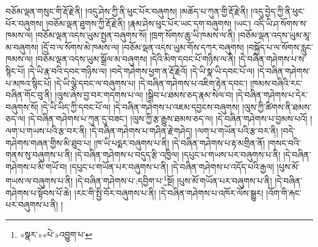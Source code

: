 བཅོམ་ལྡན་གསུང་གི་རྡོ་རྗེ་ནི། །འདུ་ཤེས་ཀྱི་ནི་ཕུང་པོར་བཞུགས། །མཆོད་པ་ཀུན་གྱི་རྡོ་རྗེ་ནི། །འདུ་བྱེད་ཀྱི་ནི་ཕུང་པོར་བཞུགས། །བཅོམ་ལྡན་ཐུགས་ཀྱི་རྡོ་རྗེ་ནི། །རྣམ་ཤེས་ཕུང་པོར་ཡང་དག་བཞུགས། །ཡང་། འདི་ཡི་ཤ་སོགས་ས་ཁམས་ལ། །བཅོམ་ལྡན་འདས་ཡུམ་སྤྱན་བཞུགས་སོ། །ཁྲག་སོགས་ཆུ་ཡི་ཁམས་ལ་ནི། །བཅོམ་ལྡན་འདས་ཡུམ་མཱ་མ་བཞུགས། །དྲོ་བ་ལ་སོགས་མེ་ཁམས་ལ། །བཅོམ་ལྡན་འདས་ཡུམ་གོས་དཀར་བཞུགས། །བསྐྱོད་པ་ལ་སོགས་རླུང་ཁམས་ལ། །བཅོམ་ལྡན་འདས་ཡུམ་སྒྲོལ་མ་བཞུགས། །དེའི་མིག་དབང་པོ་གཉིས་ལ་ནི། །དེ་བཞིན་གཤེགས་པ་ས་སྙིང་པོ། །དེ་ཡི་རྣ་བའི་དབང་གཉིས་ལ། །བདེ་གཤེགས་ཕྱག་ན་རྡོ་རྗེའོ། །དེ་ཡི་སྣ་ཡི་དབང་པོ་ལ། །དེ་བཞིན་གཤེགས་པ་མཁའ་སྙིང་པོ། །དེ་ཡི་ལྕེ་དབང་ལ་བཞུགས་པ། །དེ་བཞིན་གཤེགས་པ་འཇིག་རྟེན་དབང་། །ཁམས་བཞིའི་རང་བཞིན་གོང་བུ་ནི། །ལུས་ཞེས་བྱ་བར་གདགས་པ་ལ། །སྒྲིབ་པ་ཐམས་ཅད་རྣམ་སེལ་བ། །དེ་བཞིན་གཤེགས་པ་དེར་བཞུགས་སོ། །དེ་ཡི་ཡིད་ཀྱི་དབང་པོ་ལ། །དེ་བཞིན་གཤེགས་པ་འཇམ་དབྱངས་བཞུགས། །ལུས་ཀྱི་ཚིགས་ནི་ཐམས་ཅད་ལ། །དེ་བཞིན་གཤེགས་པ་ཀུན་དུ་བཟང་། །ལུས་ཀྱི་རྩ་རྒྱུས་ཐམས་ཅད་ལ། །དེ་བཞིན་གཤེགས་པ་བྱམས་པའོ། །ལག་པ་གཡས་པའི་རྩ་བར་ནི། །དེ་བཞིན་གཤེགས་པ་གཤིན་རྗེ་གཤེད། །ལག་པ་གཡོན་པའི་རྩ་བར་ནི། །བདེ་གཤེགས་གཞན་གྱིས་མི་ཐུབ་པ། །ཁ་ཡི་པདྨར་བཞུགས་པ་ནི། །དེ་བཞིན་གཤེགས་པ་རྟ་མགྲིན་ནོ། །གསང་བའི་གནས་སུ་བཞུགས་པ་ནི། །དེ་བཞིན་གཤེགས་པ་བདུད་རྩི་འཁྱིལ། །དཔུང་པ་གཡས་པར་བཞུགས་པ་ནི། །དེ་བཞིན་གཤེགས་པ་མི་གཡོ་བ། །དཔུང་པ་གཡོན་པར་བཞུགས་པ་ནི། །དེ་བཞིན་གཤེགས་པ་འདོད་པའི་རྒྱལ། །པུས་མོ་གཡས་ལ་བཞུགས་པ་ནི། །དེ་བཞིན་གཤེགས་པ་:དབྱིག་པ་\footnote{«སྣར་»«པེ་»འབྱུག་པ་}སྔོ། །པུས་མོ་གཡོན་པར་བཞུགས་པ་ནི། །དེ་བཞིན་གཤེགས་པ་སྟོབས་པོ་ཆེ། །རང་གི་སྤྱི་བོར་བཞུགས་པ་ནི། །དེ་བཞིན་གཤེགས་པ་འཁོར་ལོས་སྒྱུར། །འོག་གི་རྐང་པར་བཞུགས་པ་ནི། །

